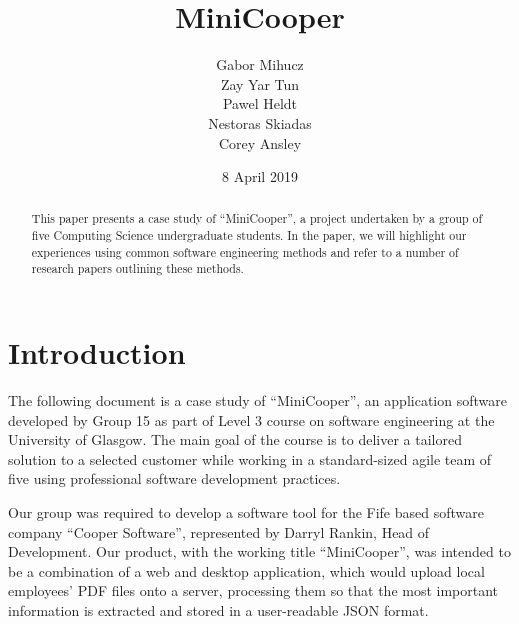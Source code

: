 \documentclass{l3proj}
\begin{document}
\title{MiniCooper}

\author{Gabor Mihucz \\
        Zay Yar Tun \\
        Pawel Heldt \\
        Nestoras Skiadas \\
        Corey Ansley}

\date{8 April 2019}

\maketitle

\begin{abstract}

This paper presents a case study of ``MiniCooper'', a project undertaken by a group of five Computing Science undergraduate students. In the paper, we will highlight our experiences using common software engineering methods and refer to a number of research papers outlining these methods.

\end{abstract}

\educationalconsent

\newpage

\clearpage
\setcounter{page}{1}
\section{Introduction}

The following document is a case study of ``MiniCooper'', an application software developed by Group 15 as part of Level 3 course on software engineering at the University of Glasgow. The main goal of the course is to deliver a tailored solution to a selected customer while working in a standard-sized agile team of five using professional software development practices.

Our group was required to develop a software tool for the Fife based software company ``Cooper Software'', represented by  Darryl Rankin, Head of Development. Our product, with the working title ``MiniCooper'', was intended to be a combination of a web and desktop application, which would upload local employees’ PDF files onto a server, processing them so that the most important information is extracted and stored in a user-readable JSON format.
\end{document}
